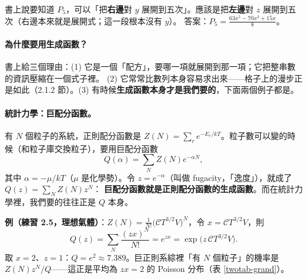 \begin{table}[H]
\centering
\caption{由 (2.1) 展開得到的 Legendre 多項式，以及兩個積分（練習 2.2、2.3）}\label{twotab-legendre}
\TwoTabLegendre
\end{table}

\begin{errbox}[p.~26，(2.1) 後]
書上說要知道 $P_5$，可以「把\textbf{右邊}對 $y$ 展開到五次」。應該是把\textbf{左邊}對 $z$ 展開到五次（右邊本來就是展開式；這一段根本沒有 $y$）。
答案：$P_5=\frac{63x^5-70x^3+15x}{8}$。
\end{errbox}

\paragraph{為什麼要用生成函數？}
書上給三個理由：(1) 它是一個「配方」，要哪一項就展開到那一項；它把整串數的資訊壓縮在一個式子裡。
(2) 它常常比數列本身容易求出來——格子上的漫步正是如此（2.1.2 節）。(3) 有時候\textbf{生成函數本身才是我們要的}，下面兩個例子都是。

\paragraph{統計力學：巨配分函數。}
有 $N$ 個粒子的系統，正則配分函數是 $Z(N)=\sum_re^{-E_r/kT}$。粒子數可以變的時候（和粒子庫交換粒子），要用巨配分函數
\[Q(\alpha)=\sum_NZ(N)e^{-\alpha N},\tag{2.2}\]
其中 $\alpha=-\mu/kT$（$\mu$ 是化學勢）。令 $z=e^{-\alpha}$（叫做 fugacity，「逸度」），就成了 $Q(z)=\sum_NZ(N)z^N$：
\textbf{巨配分函數就是正則配分函數的生成函數}。而在統計力學裡，我們要的往往正是 $Q$ 本身。

\textbf{例（練習 2.5，理想氣體）}：$Z(N)=\frac1{N!}\big(\mathcal CT^{3/2}V\big)^N$，令 $x=\mathcal CT^{3/2}V$，則
\[Q(z)=\sum_N\frac{(zx)^N}{N!}=e^{zx}=\exp\big(z\,\mathcal CT^{3/2}V\big).\]
取 $x=2$、$z=1$：$Q=e^2\approx7.389$。巨正則系綜裡「有 $N$ 個粒子」的機率是 $Z(N)z^N/Q$——這正是平均為 $zx=2$ 的 Poisson 分布（表 \ref{twotab-grand}）。
\begin{table}[H]
\centering
\caption{理想氣體（$x=\mathcal CT^{3/2}V=2$）：生成函數的係數與粒子數的機率}\label{twotab-grand}
\TwoTabGrand
\end{table}

